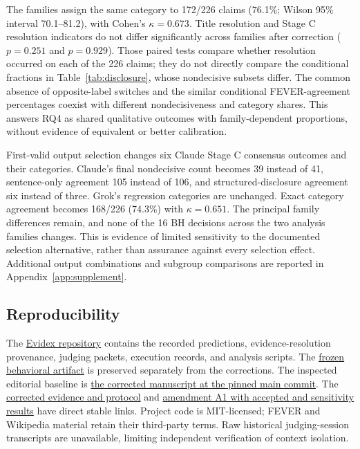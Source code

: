 \documentclass[11pt,letterpaper]{article}
\begin{document}
The families assign the same category to 172/226 claims (76.1\%; Wilson 95\% interval 70.1--81.2), with Cohen's $\kappa=0.673$. Title resolution and Stage C resolution indicators do not differ significantly across families after correction ($p=0.251$ and $p=0.929$). Those paired tests compare whether resolution occurred on each of the 226 claims; they do not directly compare the conditional fractions in Table~\ref{tab:disclosure}, whose nondecisive subsets differ. The common absence of opposite-label switches and the similar conditional FEVER-agreement percentages coexist with different nondecisiveness and category shares. This answers RQ4 as shared qualitative outcomes with family-dependent proportions, without evidence of equivalent or better calibration.

First-valid output selection changes six Claude Stage C consensus outcomes and their categories. Claude's final nondecisive count becomes 39 instead of 41, sentence-only agreement 105 instead of 106, and structured-disclosure agreement six instead of three. Grok's regression categories are unchanged. Exact category agreement becomes 168/226 (74.3\%) with $\kappa=0.651$. The principal family differences remain, and none of the 16 BH decisions across the two analysis families changes. This is evidence of limited sensitivity to the documented selection alternative, rather than assurance against every selection effect. Additional output combinations and subgroup comparisons are reported in Appendix~\ref{app:supplement}.

\subsection{Reproducibility}\label{sec:repro}
The \href{https://github.com/ChimdumebiNebolisa/Evidex}{Evidex repository} contains the recorded predictions, evidence-resolution provenance, judging packets, execution records, and analysis scripts. The \href{https://github.com/ChimdumebiNebolisa/Evidex/tree/evidex-artifact-v1}{frozen behavioral artifact} is preserved separately from the corrections. The inspected editorial baseline is \href{https://github.com/ChimdumebiNebolisa/Evidex/tree/fcb35b161e297fe756daef299772d5fe47f17ff3/paper_corrected_draft}{the corrected manuscript at the pinned main commit}. The \href{https://github.com/ChimdumebiNebolisa/Evidex/tree/fcb35b161e297fe756daef299772d5fe47f17ff3/corrections_v2}{corrected evidence and protocol} and \href{https://github.com/ChimdumebiNebolisa/Evidex/tree/fcb35b161e297fe756daef299772d5fe47f17ff3/corrections_v2/amendment_2026-09-28}{amendment A1 with accepted and sensitivity results} have direct stable links. Project code is MIT-licensed; FEVER and Wikipedia material retain their third-party terms. Raw historical judging-session transcripts are unavailable, limiting independent verification of context isolation.
\end{document}
